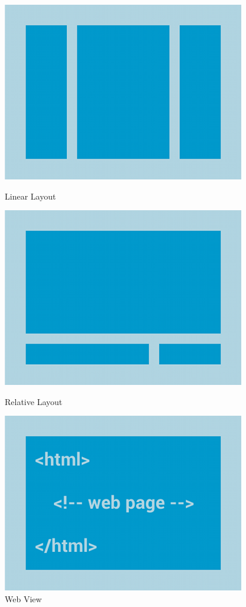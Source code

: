 \begin{figure}[H]
  \includegraphics[width=\linewidth]{02-layouts/linearlayout.png}
  \caption{Linear Layout}
\endminipage\hfill
{}
  \includegraphics[width=\linewidth]{02-layouts/relativelayout.png}
  \caption{Relative Layout}
\endminipage\hfill
{}%
  \includegraphics[width=\linewidth]{02-layouts/webview.png}
  \caption{Web View}
\endminipage
\end{figure}

